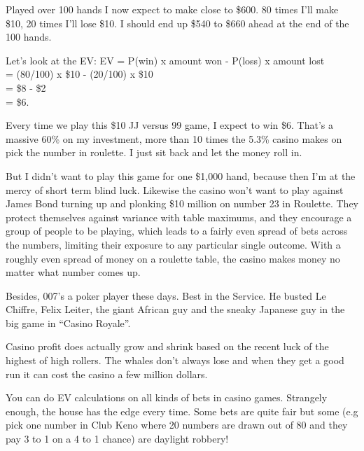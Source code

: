 Played over 100 hands I now expect to make close to \$600. 80 times I'll
make \$10, 20 times I'll lose \$10. I should end up \$540 to \$660 ahead
at the end of the 100 hands.

Let's look at the EV:
EV = P(win) x amount won - P(loss) x amount lost \\
   = (80/100) x \$10 - (20/100) x \$10 \\
   = \$8 - \$2 \\
   = \$6.

Every time we play this \$10 JJ versus 99 game, I expect to win \$6. That's a
massive 60\% on my investment, more than 10 times the 5.3\% casino makes on
pick the number in roulette. I just sit back and let the money roll in.

But I didn't want to play this game for one \$1,000 hand, because then
I'm at the mercy of short term blind luck. Likewise the casino won't
want to play against James Bond turning up and plonking \$10 million
on number 23 in Roulette. They protect themselves against variance
with table maximums, and they encourage a group of people to be playing,
which leads to a fairly even spread of bets across the numbers, limiting
their exposure to any particular single outcome. With a roughly even spread
of money on a roulette table, the casino makes money no matter what
number comes up.

Besides, 007's a poker player these days. Best in the Service.
He busted Le Chiffre, Felix Leiter, the giant African guy and
the sneaky Japanese guy in the big game in ``Casino Royale''.

Casino profit does actually grow and shrink based on the recent luck
of the highest of high rollers. The whales don't always lose and when
they get a good run it can cost the casino a few million dollars.

You can do EV calculations on all kinds of bets in casino games.
Strangely enough, the house has the edge every time. Some bets
are quite fair but some (e.g pick one number in Club Keno
where 20 numbers are drawn out of 80 and they pay
3 to 1 on a 4 to 1 chance) are daylight robbery!



